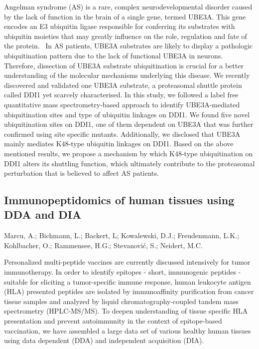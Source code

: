 {Angelman syndrome (AS) is a rare, complex neurodevelopmental disorder caused by the lack of function in the brain of a single gene, termed UBE3A. This gene encodes an E3 ubiquitin ligase responsible for conferring its substrates with ubiquitin moieties that may greatly influence on the role, regulation and fate of the protein.  In AS patients, UBE3A substrates are likely to display a pathologic ubiquitination pattern due to the lack of functional UBE3A in neurons. Therefore, dissection of UBE3A substrate ubiquitination is crucial for a better understanding of the molecular mechanisms underlying this disease. We recently discovered and validated one UBE3A substrate, a proteasomal shuttle protein called DDI1 yet scarcely characterised. In this study, we followed a label free quantitative mass spectrometry-based approach to identify UBE3A-mediated ubiquitination sites and type of ubiquitin linkages on DDI1. We found five novel ubiquitination sites on DDI1, one of them dependent on UBE3A that was further confirmed using site specific mutants. Additionally, we disclosed that UBE3A mainly mediates K48-type ubiquitin linkages on DDI1. Based on the above mentioned results, we propose a mechanism by which K48-type ubiquitination on DDI1 alters its shuttling function, which ultimately contribute to the proteasomal perturbation that is believed to affect AS patients.


\subsection*{\color{eubicRed} Immunopeptidomics of human tissues using DDA and DIA}
{\color{eubicGray}Marcu, A.;
Bichmann, L.;
Backert, L;
Kowalewski, D.J.;
Freudenmann, L.K.;
Kohlbacher, O.;
Rammensee, H.G.;
Stevanović, S.;
Neidert, M.C.}

Personalized multi-peptide vaccines are currently discussed intensively for tumor immunotherapy. In order to identify epitopes - short, immunogenic peptides - suitable for eliciting a tumor-specific immune response, human leukocyte antigen (HLA) presented peptides are isolated by immunoaffinity purification from cancer tissue samples and analyzed by liquid chromatography-coupled tandem mass spectrometry (HPLC-MS/MS). To deepen understanding of tissue specific HLA presentation and prevent autoimmunity in the context of epitope-based vaccination, we have assembled a large data set of various healthy human tissues using data dependent (DDA) and independent acquisition (DIA).

}%
